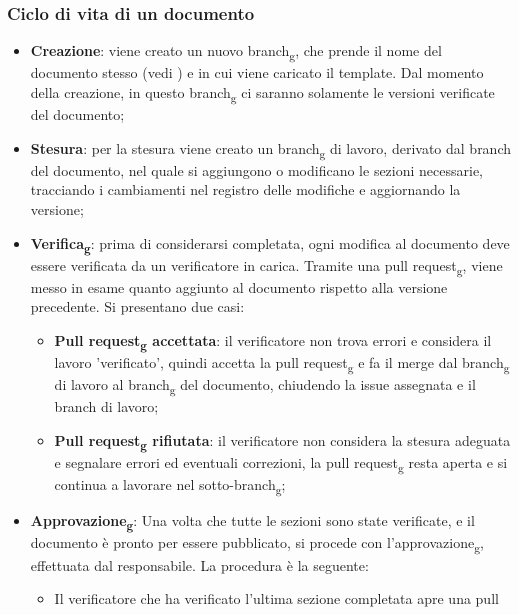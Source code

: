 \subsubsection{Ciclo di vita di un documento}
\begin{itemize}
      \item \textbf{Creazione}: viene creato un nuovo branch\textsubscript{g}, che prende il nome del documento stesso
            (vedi ) e in cui viene caricato il template. Dal momento della creazione, in questo
            branch\textsubscript{g} ci saranno solamente le versioni verificate del documento;
      \item \textbf{Stesura}: per la stesura viene creato un branch\textsubscript{g} di lavoro, derivato dal branch del documento, nel quale si aggiungono o modificano le
            sezioni necessarie, tracciando i cambiamenti nel registro delle modifiche e aggiornando la versione;
      \item \textbf{Verifica\textsubscript{g}}: prima di considerarsi completata, ogni modifica al documento deve essere verificata da un verificatore in carica.
            Tramite una pull request\textsubscript{g}, viene messo in esame quanto aggiunto al documento rispetto alla versione precedente. Si presentano due casi:
            \begin{itemize}
                  \item \textbf{Pull request\textsubscript{g} accettata}: il verificatore non trova errori e considera il lavoro 'verificato', quindi accetta la pull request\textsubscript{g} e fa il merge dal branch\textsubscript{g} di lavoro al branch\textsubscript{g} del documento, chiudendo la issue assegnata e il branch di lavoro;
                  \item \textbf{Pull request\textsubscript{g} rifiutata}: il verificatore non considera la stesura adeguata e segnalare errori ed eventuali correzioni, la pull request\textsubscript{g} resta aperta e si continua a lavorare nel sotto-branch\textsubscript{g};
            \end{itemize}
      \item \textbf{Approvazione\textsubscript{g}}: Una volta che tutte le sezioni sono state verificate, e il documento è pronto per essere pubblicato,
            si procede con l'approvazione\textsubscript{g}, effettuata dal responsabile. La procedura è la seguente:
            \begin{itemize}
                  \item Il verificatore che ha verificato l'ultima sezione completata apre una pull

\end{itemize}
\end{itemize}
